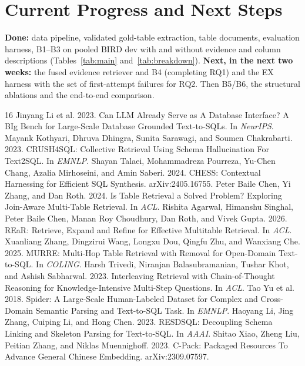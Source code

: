 \documentclass[sigconf,nonacm]{acmart}
\begin{document}
\section{Current Progress and Next Steps}

\textbf{Done:} data pipeline, validated gold-table extraction, table documents, evaluation harness, B1--B3 on pooled BIRD dev with and without evidence and column descriptions (Tables~\ref{tab:main} and~\ref{tab:breakdown}). \textbf{Next, in the next two weeks:} the fused evidence retriever and B4 (completing RQ1) and the EX harness with the set of first-attempt failures for RQ2. Then B5/B6, the structural ablations and the end-to-end comparison.

\begin{thebibliography}{16}
 Jinyang Li et al. 2023. Can LLM Already Serve as A Database Interface? A BIg Bench for Large-Scale Database Grounded Text-to-SQLs. In \emph{NeurIPS}.
 Mayank Kothyari, Dhruva Dhingra, Sunita Sarawagi, and Soumen Chakrabarti. 2023. CRUSH4SQL: Collective Retrieval Using Schema Hallucination For Text2SQL. In \emph{EMNLP}.
 Shayan Talaei, Mohammadreza Pourreza, Yu-Chen Chang, Azalia Mirhoseini, and Amin Saberi. 2024. CHESS: Contextual Harnessing for Efficient SQL Synthesis. arXiv:2405.16755.
 Peter Baile Chen, Yi Zhang, and Dan Roth. 2024. Is Table Retrieval a Solved Problem? Exploring Join-Aware Multi-Table Retrieval. In \emph{ACL}.
 Rishita Agarwal, Himanshu Singhal, Peter Baile Chen, Manan Roy Choudhury, Dan Roth, and Vivek Gupta. 2026. REaR: Retrieve, Expand and Refine for Effective Multitable Retrieval. In \emph{ACL}.
 Xuanliang Zhang, Dingzirui Wang, Longxu Dou, Qingfu Zhu, and Wanxiang Che. 2025. MURRE: Multi-Hop Table Retrieval with Removal for Open-Domain Text-to-SQL. In \emph{COLING}.
 Harsh Trivedi, Niranjan Balasubramanian, Tushar Khot, and Ashish Sabharwal. 2023. Interleaving Retrieval with Chain-of-Thought Reasoning for Knowledge-Intensive Multi-Step Questions. In \emph{ACL}.
 Tao Yu et al. 2018. Spider: A Large-Scale Human-Labeled Dataset for Complex and Cross-Domain Semantic Parsing and Text-to-SQL Task. In \emph{EMNLP}.
 Haoyang Li, Jing Zhang, Cuiping Li, and Hong Chen. 2023. RESDSQL: Decoupling Schema Linking and Skeleton Parsing for Text-to-SQL. In \emph{AAAI}.
 Shitao Xiao, Zheng Liu, Peitian Zhang, and Niklas Muennighoff. 2023. C-Pack: Packaged Resources To Advance General Chinese Embedding. arXiv:2309.07597.

\end{thebibliography}
\end{document}
